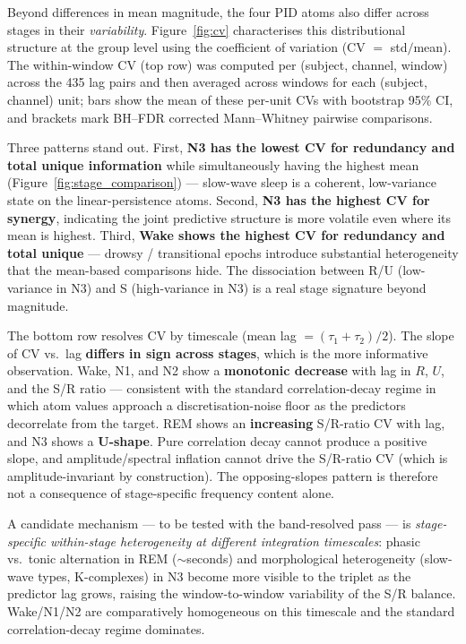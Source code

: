 \documentclass[11pt,a4paper]{article}
\begin{document}
Beyond differences in mean magnitude, the four PID atoms also differ across
stages in their \emph{variability}.  Figure~\ref{fig:cv} characterises this
distributional structure at the group level using the coefficient of
variation (CV $=$ std$/$mean).  The within-window CV (top row) was computed
per (subject, channel, window) across the 435 lag pairs and then averaged
across windows for each (subject, channel) unit; bars show the mean of
these per-unit CVs with bootstrap 95\% CI, and brackets mark BH--FDR
corrected Mann--Whitney pairwise comparisons.

Three patterns stand out.  First, \textbf{N3 has the lowest CV for
redundancy and total unique information} while simultaneously having the
highest mean (Figure~\ref{fig:stage_comparison}) --- slow-wave sleep is a
coherent, low-variance state on the linear-persistence atoms.  Second,
\textbf{N3 has the highest CV for synergy}, indicating the joint
predictive structure is more volatile even where its mean is highest.
Third, \textbf{Wake shows the highest CV for redundancy and total unique}
--- drowsy / transitional epochs introduce substantial heterogeneity that
the mean-based comparisons hide.  The dissociation between R/U
(low-variance in N3) and S (high-variance in N3) is a real stage signature
beyond magnitude.

The bottom row resolves CV by timescale (mean lag $= (\tau_1+\tau_2)/2$).
The slope of CV vs.\ lag \textbf{differs in sign across stages}, which is
the more informative observation.  Wake, N1, and N2 show a
\textbf{monotonic decrease} with lag in $R$, $U$, and the S/R ratio ---
consistent with the standard correlation-decay regime in which atom
values approach a discretisation-noise floor as the predictors
decorrelate from the target.  REM shows an \textbf{increasing}
S/R-ratio CV with lag, and N3 shows a \textbf{U-shape}.  Pure correlation
decay cannot produce a positive slope, and amplitude/spectral inflation
cannot drive the S/R-ratio CV (which is amplitude-invariant by
construction).  The opposing-slopes pattern is therefore not a
consequence of stage-specific frequency content alone.

A candidate mechanism --- to be tested with the band-resolved pass ---
is \emph{stage-specific within-stage heterogeneity at different
integration timescales}: phasic vs.\ tonic alternation in REM
($\sim$seconds) and morphological heterogeneity (slow-wave types,
K-complexes) in N3 become more visible to the triplet as the predictor
lag grows, raising the window-to-window variability of the S/R balance.
Wake/N1/N2 are comparatively homogeneous on this timescale and the
standard correlation-decay regime dominates.
\end{document}
